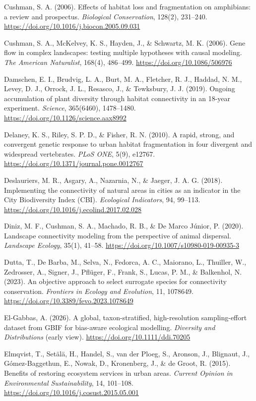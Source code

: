\documentclass[a4paper,11pt]{report}
\begin{document}
Cushman, S. A. (2006). Effects of habitat loss and fragmentation on amphibians: a review and prospectus. \textit{Biological Conservation}, 128(2), 231--240. \url{https://doi.org/10.1016/j.biocon.2005.09.031}

Cushman, S. A., McKelvey, K. S., Hayden, J., \& Schwartz, M. K. (2006). Gene flow in complex landscapes: testing multiple hypotheses with causal modeling. \textit{The American Naturalist}, 168(4), 486--499. \url{https://doi.org/10.1086/506976}

Damschen, E. I., Brudvig, L. A., Burt, M. A., Fletcher, R. J., Haddad, N. M., Levey, D. J., Orrock, J. L., Resasco, J., \& Tewksbury, J. J. (2019). Ongoing accumulation of plant diversity through habitat connectivity in an 18-year experiment. \textit{Science}, 365(6460), 1478--1480. \url{https://doi.org/10.1126/science.aax8992}

Delaney, K. S., Riley, S. P. D., \& Fisher, R. N. (2010). A rapid, strong, and convergent genetic response to urban habitat fragmentation in four divergent and widespread vertebrates. \textit{PLoS ONE}, 5(9), e12767. \url{https://doi.org/10.1371/journal.pone.0012767}

Deslauriers, M. R., Asgary, A., Nazarnia, N., \& Jaeger, J. A. G. (2018). Implementing the connectivity of natural areas in cities as an indicator in the City Biodiversity Index (CBI). \textit{Ecological Indicators}, 94, 99--113. \url{https://doi.org/10.1016/j.ecolind.2017.02.028}

Diniz, M. F., Cushman, S. A., Machado, R. B., \& De Marco Júnior, P. (2020). Landscape connectivity modeling from the perspective of animal dispersal. \textit{Landscape Ecology}, 35(1), 41--58. \url{https://doi.org/10.1007/s10980-019-00935-3}

Dutta, T., De Barba, M., Selva, N., Fedorca, A. C., Maiorano, L., Thuiller, W., Zedrosser, A., Signer, J., Pflüger, F., Frank, S., Lucas, P. M., \& Balkenhol, N. (2023). An objective approach to select surrogate species for connectivity conservation. \textit{Frontiers in Ecology and Evolution}, 11, 1078649. \url{https://doi.org/10.3389/fevo.2023.1078649}

El-Gabbas, A. (2026). A global, taxon-stratified, high-resolution sampling-effort dataset from GBIF for bias-aware ecological modelling. \textit{Diversity and Distributions} (early view). \url{https://doi.org/10.1111/ddi.70205}

Elmqvist, T., Setälä, H., Handel, S., van der Ploeg, S., Aronson, J., Blignaut, J., Gómez-Baggethun, E., Nowak, D., Kronenberg, J., \& de Groot, R. (2015). Benefits of restoring ecosystem services in urban areas. \textit{Current Opinion in Environmental Sustainability}, 14, 101--108. \url{https://doi.org/10.1016/j.cosust.2015.05.001}
\end{document}

